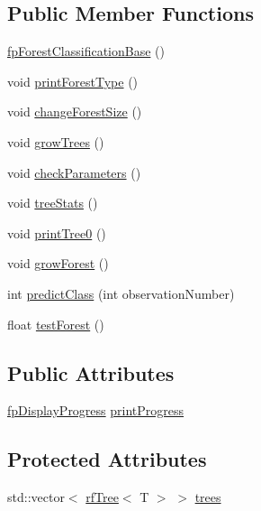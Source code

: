 \subsection*{Public Member Functions}
\begin{DoxyCompactItemize}
\item 
\hyperlink{classfp_1_1fpForestClassificationBase_a788f11473d1b7c86928d021617a92f2a}{fp\+Forest\+Classification\+Base} ()
\item 
void \hyperlink{classfp_1_1fpForestClassificationBase_a6b5243d32b468308a4f013ad5a9df2dd}{print\+Forest\+Type} ()
\item 
void \hyperlink{classfp_1_1fpForestClassificationBase_a696b361df0a1c9aa36687333e2d8111b}{change\+Forest\+Size} ()
\item 
void \hyperlink{classfp_1_1fpForestClassificationBase_aea9db2571269f0f627226aa75ec4a694}{grow\+Trees} ()
\item 
void \hyperlink{classfp_1_1fpForestClassificationBase_a3186e3b6471f82df3f69172f67aa7d19}{check\+Parameters} ()
\item 
void \hyperlink{classfp_1_1fpForestClassificationBase_a48567d379434daeccb1540c84674d286}{tree\+Stats} ()
\item 
void \hyperlink{classfp_1_1fpForestClassificationBase_a1989f90fbd27ac90232b7a1071c96a00}{print\+Tree0} ()
\item 
void \hyperlink{classfp_1_1fpForestClassificationBase_a706225fdbef8c71fb022f4c3446b388d}{grow\+Forest} ()
\item 
int \hyperlink{classfp_1_1fpForestClassificationBase_ad0c690fff971fab681467fbcd8762b5f}{predict\+Class} (int observation\+Number)
\item 
float \hyperlink{classfp_1_1fpForestClassificationBase_a3f1ad5a5cfb3633713d0a81bd1c356e8}{test\+Forest} ()
\end{DoxyCompactItemize}
\subsection*{Public Attributes}
\begin{DoxyCompactItemize}
\item 
\hyperlink{classfp_1_1fpDisplayProgress}{fp\+Display\+Progress} \hyperlink{classfp_1_1fpForestClassificationBase_a21148775a113092d6929e0d28e351a2c}{print\+Progress}
\end{DoxyCompactItemize}
\subsection*{Protected Attributes}
\begin{DoxyCompactItemize}
\item 
std\+::vector$<$ \hyperlink{classfp_1_1rfTree}{rf\+Tree}$<$ T $>$ $>$ \hyperlink{classfp_1_1fpForestClassificationBase_a51482a6c95c4b3cb42627f029c2d4662}{trees}
\end{DoxyCompactItemize}


